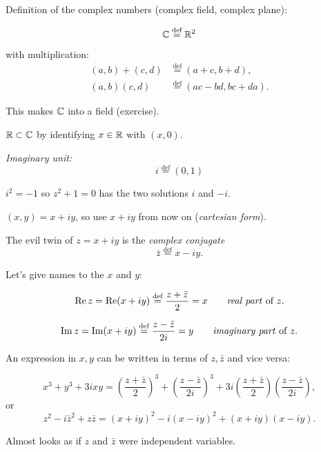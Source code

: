 \documentclass[10pt,aspectratio=169]{beamer}
\begin{document}
\begin{frame}
Definition of the complex numbers (complex field, complex plane):

\[
\C \overset{\text{def}}{=} \R^2
\]

with multiplication:
\begin{align*}
(a,b) + (c,d) & \overset{\text{def}}{=} (a+c,b+d) , \\
(a,b) (c,d) & \overset{\text{def}}{=} (ac-bd,bc+da) .
\end{align*}

\pause

This makes $\C$ into a field (exercise).

\pause
\medskip

$\R \subset \C$ by identifying $x \in \R$ with $(x,0)$.

\pause
\medskip

\emph{Imaginary unit:}
\[
i \overset{\text{def}}{=} (0,1)
\]

\pause
\medskip

$
i^2 = -1
$
\qquad so
$z^2+1=0$ has the two solutions $i$ and $-i$.
\end{frame}

\begin{frame}

$(x,y) = x+iy$, so use $x+iy$ from now on (\emph{cartesian form}).

\medskip
\pause

The evil twin of $z=x+iy$ is the \emph{complex conjugate}
\[
\bar{z} \overset{\text{def}}{=} x-iy.
\]

\medskip
\pause

Let's give names to the $x$ and $y$:

\[
\Re z = 
\Re (x+iy)
\overset{\text{def}}{=}
\frac{z+\bar{z}}{2}
= x
\qquad \text{\emph{real part} of } z .
\]

\pause

\[
\Im z = 
\Im (x+iy)
\overset{\text{def}}{=}
\frac{z-\bar{z}}{2i}
= y
\qquad \text{\emph{imaginary part} of } z .
\]

\pause

An expression in $x,y$ can be written in terms of $z,\bar{z}$
and vice versa:

\[
x^3 + y^3 + 3ixy
=
{\left( \frac{z+ \bar{z}}{2} \right)}^3 + 
{\left( \frac{z- \bar{z}}{2i} \right)}^3 + 
3i {\left( \frac{z+ \bar{z}}{2} \right)} 
{\left( \frac{z- \bar{z}}{2i} \right)} ,
\]
\pause
or
\[
z^2 - i \bar{z}^2 + z \bar{z}
=
{(x+iy)}^2 - i {(x-iy)}^2 + 
(x+iy)(x-iy) .
\]
\pause

Almost looks as if $z$ and $\bar{z}$ were independent variables.
\end{frame}
\end{document}
